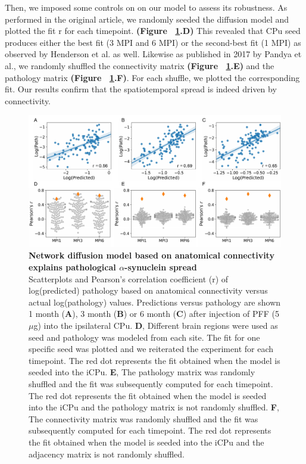 \begin{table}[ht]
\begin{center}
\begin{tabular}{|l|c|c|}
      
    \end{tabular}
  \end{center}
\end{table}

Then, we imposed some controls on on our model to assess its robustness. As performed in the original article, we randomly seeded the diffusion model and plotted the fit r for each timepoint. \textbf{(Figure ~\ref{fig:fig1}.D)} This revealed that CPu seed produces either the best fit (3 MPI and 6 MPI) or the second-best fit (1 MPI) as observed by Henderson et al. as well. 
Likewise as published in 2017 by Pandya et al., we randomly shuffled the connectivity matrix \textbf{(Figure ~\ref{fig:fig1}.E)} and the pathology matrix \textbf{(Figure ~\ref{fig:fig1}.F)}. For each shuffle, we plotted the corresponding fit. \cite{Pandya_2017} Our results confirm that the spatiotemporal spread is indeed driven by connectivity.


\begin{figure}[h]
 
    \includegraphics[width = \linewidth]{Figures/Fig1.pdf}
    \centering
    \caption{\textbf{Network diffusion model based on anatomical connectivity explains pathological $\alpha$-synuclein spread}\\
    \label{fig:fig1}
    Scatterplots and Pearson's correlation coefficient (r) of log(predicted) pathology based on anatomical connectivity versus actual log(pathology) values. Predictions versus pathology are shown 1 month (\textbf{A}), 3 month (\textbf{B}) or 6 month (\textbf{C}) after injection of PFF (5$\mu$g) into the ipsilateral CPu.
    \textbf{D}, Different brain regions were used as seed and pathology was modeled from each site. The fit for one specific seed was plotted and we reiterated the experiment for each timepoint. The red dot represents the fit obtained when the model is seeded into the iCPu. \textbf{E}, The pathology matrix was randomly shuffled and the fit was subsequently computed for each timepoint. The red dot represents the fit obtained when the model is seeded into the iCPu and the pathology matrix is not randomly shuffled. \textbf{F}, The connectivity matrix was randomly shuffled and the fit was subsequently computed for each timepoint. The red dot represents the fit obtained when the model is seeded into the iCPu and the adjacency matrix is not randomly shuffled.}
    
\end{figure}
    
